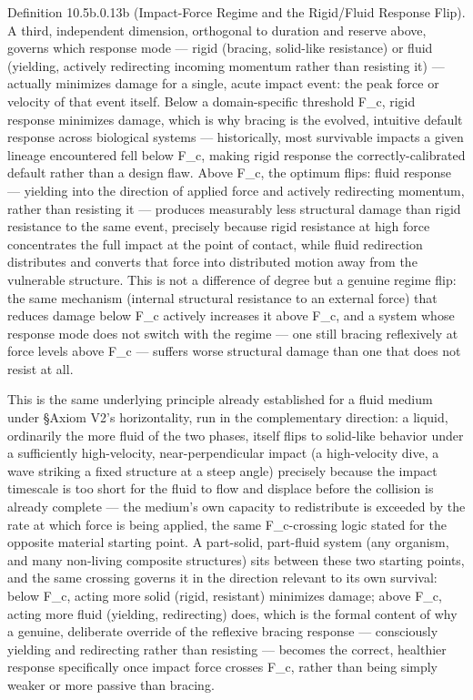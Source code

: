 \documentclass[
]{article}
\begin{document}
Definition 10.5b.0.13b (Impact-Force Regime and the Rigid/Fluid Response
Flip). A third, independent dimension, orthogonal to duration and
reserve above, governs which response mode --- rigid (bracing,
solid-like resistance) or fluid (yielding, actively redirecting incoming
momentum rather than resisting it) --- actually minimizes damage for a
single, acute impact event: the peak force or velocity of that event
itself. Below a domain-specific threshold F\_c, rigid response minimizes
damage, which is why bracing is the evolved, intuitive default response
across biological systems --- historically, most survivable impacts a
given lineage encountered fell below F\_c, making rigid response the
correctly-calibrated default rather than a design flaw. Above F\_c, the
optimum flips: fluid response --- yielding into the direction of applied
force and actively redirecting momentum, rather than resisting it ---
produces measurably less structural damage than rigid resistance to the
same event, precisely because rigid resistance at high force
concentrates the full impact at the point of contact, while fluid
redirection distributes and converts that force into distributed motion
away from the vulnerable structure. This is not a difference of degree
but a genuine regime flip: the same mechanism (internal structural
resistance to an external force) that reduces damage below F\_c actively
increases it above F\_c, and a system whose response mode does not
switch with the regime --- one still bracing reflexively at force levels
above F\_c --- suffers worse structural damage than one that does not
resist at all.

This is the same underlying principle already established for a fluid
medium under §Axiom V2's horizontality, run in the complementary
direction: a liquid, ordinarily the more fluid of the two phases, itself
flips to solid-like behavior under a sufficiently high-velocity,
near-perpendicular impact (a high-velocity dive, a wave striking a fixed
structure at a steep angle) precisely because the impact timescale is
too short for the fluid to flow and displace before the collision is
already complete --- the medium's own capacity to redistribute is
exceeded by the rate at which force is being applied, the same
F\_c-crossing logic stated for the opposite material starting point. A
part-solid, part-fluid system (any organism, and many non-living
composite structures) sits between these two starting points, and the
same crossing governs it in the direction relevant to its own survival:
below F\_c, acting more solid (rigid, resistant) minimizes damage; above
F\_c, acting more fluid (yielding, redirecting) does, which is the
formal content of why a genuine, deliberate override of the reflexive
bracing response --- consciously yielding and redirecting rather than
resisting --- becomes the correct, healthier response specifically once
impact force crosses F\_c, rather than being simply weaker or more
passive than bracing.
\end{document}
